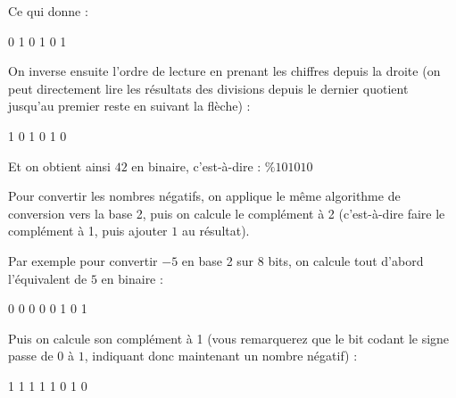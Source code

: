 \documentclass[11pt,a4paper]{article}
\begin{document}
Ce qui donne :

\smallskip

{ 0 \hspace*{0.2cm} 1 \hspace*{0.2cm} 0 \hspace*{0.2cm} 1 \hspace*{0.2cm} 0 \hspace*{0.2cm} 1 }

\smallskip

On inverse ensuite l'ordre de lecture en prenant les chiffres depuis la droite (on peut directement lire les résultats des divisions depuis le dernier quotient jusqu'au premier reste en suivant la flèche) :

\smallskip

{ 1 \hspace*{0.2cm} 0 \hspace*{0.2cm} 1 \hspace*{0.2cm} 0 \hspace*{0.2cm} 1 \hspace*{0.2cm} 0 }

\smallskip

Et on obtient ainsi $ 42 $ en binaire, c'est-à-dire : $ \% 101010 $


\bigskip


Pour convertir les nombres négatifs, on applique le même algorithme de conversion vers la base 2, puis on calcule le complément à 2 (c'est-à-dire faire le complément à 1, puis ajouter $ 1 $ au résultat).

\bigskip

Par exemple pour convertir $ -5 $ en base 2 sur 8 bits, on calcule tout d'abord l'équivalent de $ 5 $ en binaire :

\medskip

{ 0 \hspace*{0.2cm} 0 \hspace*{0.2cm} 0 \hspace*{0.2cm} 0 \hspace*{0.2cm} 0 \hspace*{0.2cm} 1 \hspace*{0.2cm} 0 \hspace*{0.2cm} 1 }

\medskip

Puis on calcule son complément à 1 (vous remarquerez que le bit codant le signe passe de $ 0 $ à $ 1 $, indiquant donc maintenant un nombre négatif) :

\medskip

{ 1 \hspace*{0.2cm} 1 \hspace*{0.2cm} 1 \hspace*{0.2cm} 1 \hspace*{0.2cm} 1 \hspace*{0.2cm} 0 \hspace*{0.2cm} 1 \hspace*{0.2cm} 0 }
\end{document}
